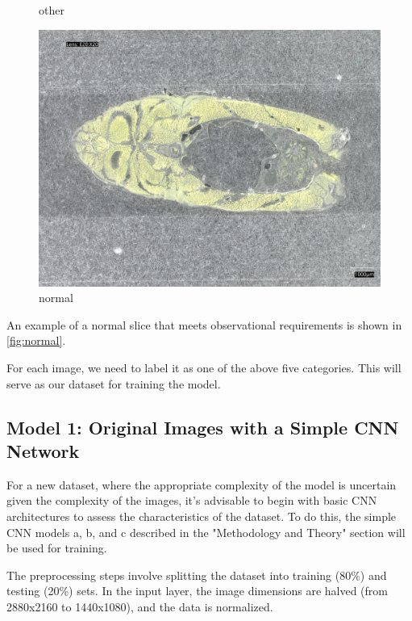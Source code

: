 \begin{figure}[H]
\begin{minipage}{0.32\textwidth}
        \caption{other}
        \label{fig:other}
    \end{minipage}
    \begin{minipage}{0.32\textwidth}
        \centering
        \includegraphics[width=\textwidth]{./fig/sample_1/normal.jpg}
        \caption{normal}
        \label{fig:normal}
    \end{minipage}
\end{figure}

An example of a normal slice that meets observational requirements is shown in \autoref{fig:normal}.


For each image, we need to label it as one of the above five categories. This will serve as our dataset for training the model.

\subsection{Model 1: Original Images with a Simple CNN Network}

For a new dataset, where the appropriate complexity of the model is uncertain given the complexity of the images, it's advisable to begin with basic CNN architectures to assess the characteristics of the dataset. To do this, the simple CNN models a, b, and c described in the "Methodology and Theory" section will be used for training.

The preprocessing steps involve splitting the dataset into training (80\%) and testing (20\%) sets. In the input layer, the image dimensions are halved (from 2880x2160 to 1440x1080), and the data is normalized.

